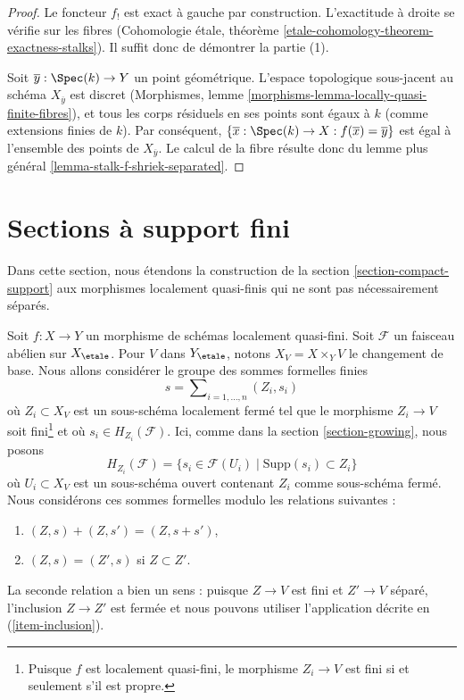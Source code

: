\begin{proof}
Le foncteur $f_!$ est exact à gauche par construction. L'exactitude à droite
se vérifie sur les fibres
(Cohomologie étale, théorème \ref{etale-cohomology-theorem-exactness-stalks}).
Il suffit donc de démontrer la partie (1).

\medskip\noindent
Soit $\overline{y} : \Spec(k) \to Y$ un point géométrique.
L'espace topologique sous-jacent au schéma $X_{\overline{y}}$
est discret
(Morphismes, lemme \ref{morphisms-lemma-locally-quasi-finite-fibres}),
et tous les corps résiduels en ses points sont égaux à $k$
(comme extensions finies de $k$). Par conséquent,
$\{\overline{x} : \Spec(k) \to X : f(\overline{x}) = \overline{y}\}$
est égal à l'ensemble des points de $X_{\overline{y}}$.
Le calcul de la fibre résulte donc du
lemme plus général \ref{lemma-stalk-f-shriek-separated}.
\end{proof}









\section{Sections à support fini}
\label{section-finite-support}

\noindent
Dans cette section, nous étendons la construction de la
section \ref{section-compact-support} aux morphismes localement
quasi-finis qui ne sont pas nécessairement séparés.

\medskip\noindent
Soit $f : X \to Y$ un morphisme de schémas localement quasi-fini.
Soit $\mathcal{F}$ un faisceau abélien sur $X_\etale$. Pour $V$ dans
$Y_\etale$, notons $X_V = X \times_Y V$ le changement de base. Nous allons
considérer le groupe des sommes formelles finies
\begin{equation}
\label{equation-formal-sum}
s = \sum\nolimits_{i = 1, \ldots, n} (Z_i, s_i)
\end{equation}
où $Z_i \subset X_V$ est un sous-schéma localement fermé tel que le
morphisme $Z_i \to V$ soit fini\footnote{Puisque $f$ est localement quasi-fini,
le morphisme $Z_i \to V$ est fini si et seulement s'il est propre.}
et où $s_i \in H_{Z_i}(\mathcal{F})$. Ici, comme dans la
section \ref{section-growing}, nous posons
$$
H_{Z_i}(\mathcal{F}) =
\{s_i \in \mathcal{F}(U_i) \mid \text{Supp}(s_i) \subset Z_i\}
$$
où $U_i \subset X_V$ est un sous-schéma ouvert contenant $Z_i$ comme
sous-schéma fermé. Nous considérons ces sommes formelles modulo les
relations suivantes :
\begin{enumerate}
\item
\label{item-sum}
$(Z, s) + (Z, s') = (Z, s + s')$,
\item
\label{item-sub}
$(Z, s) = (Z', s)$ si $Z \subset Z'$.
\end{enumerate}
La seconde relation a bien un sens : puisque $Z \to V$ est fini
et $Z' \to V$ séparé, l'inclusion $Z \to Z'$ est fermée et nous
pouvons utiliser l'application décrite en (\ref{item-inclusion}).

